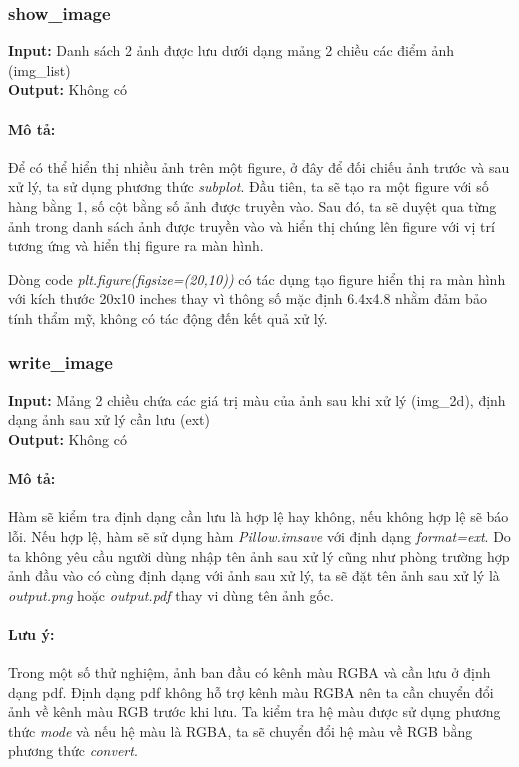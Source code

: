 \documentclass{article}
\begin{document}
\subsubsection{show\_image}
\textbf{Input:} Danh sách 2 ảnh được lưu dưới dạng mảng 2 chiều các điểm ảnh (img\_list) \\
\textbf{Output:} Không có

\paragraph*{Mô tả:}
Để có thể hiển thị nhiều ảnh trên một figure, ở đây để đối chiếu ảnh trước và sau xử lý, ta sử dụng phương thức \textit{subplot}. Đầu tiên, ta sẽ tạo ra một figure với số hàng bằng 1, số cột bằng số ảnh được truyền vào. Sau đó, ta sẽ duyệt qua từng ảnh trong danh sách ảnh được truyền vào và hiển thị chúng lên figure với vị trí tương ứng và hiển thị figure ra màn hình.

Dòng code \textit{plt.figure(figsize=(20,10))} có tác dụng tạo figure hiển thị ra màn hình với kích thước 20x10 inches thay vì thông số mặc định 6.4x4.8 nhằm đảm bảo tính thẩm mỹ, không có tác động đến kết quả xử lý.

\subsubsection{write\_image}
\textbf{Input:} Mảng 2 chiều chứa các giá trị màu của ảnh sau khi xử lý (img\_2d), định dạng ảnh sau xử lý cần lưu (ext)\\
\textbf{Output:} Không có

\paragraph*{Mô tả:}
Hàm sẽ kiểm tra định dạng cần lưu là hợp lệ hay không, nếu không hợp lệ sẽ báo lỗi. Nếu hợp lệ, hàm sẽ sử dụng hàm \textit{Pillow.imsave} với định dạng \textit{format=ext}. Do ta không yêu cầu người dùng nhập tên ảnh sau xử lý cũng như phòng trường hợp ảnh đầu vào có cùng định dạng với ảnh sau xử lý, ta sẽ đặt tên ảnh sau xử lý là \textit{output.png} hoặc \textit{output.pdf} thay vi dùng tên ảnh gốc.

\paragraph*{Lưu ý:}
Trong một số thử nghiệm, ảnh ban đầu có kênh màu RGBA và cần lưu ở định dạng pdf. Định dạng pdf không hỗ trợ kênh màu RGBA nên ta cần chuyển đổi ảnh về kênh màu RGB trước khi lưu. Ta kiểm tra hệ màu được sử dụng phương thức \textit{mode} và nếu hệ màu là RGBA, ta sẽ chuyển đổi hệ màu về RGB bằng phương thức \textit{convert}.
\end{document}
